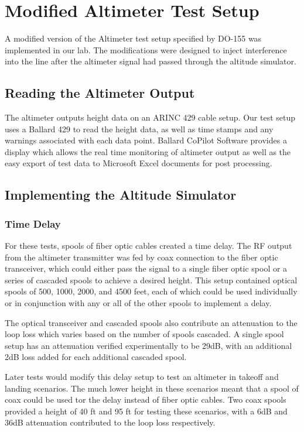 \section{Modified Altimeter Test Setup} 
A modified version of the Altimeter test setup specified by DO-155 was implemented in our lab. The modifications were designed to inject interference into the line after the altimeter signal had passed through the altitude simulator. 
\subsection{Reading the Altimeter Output}
The altimeter outputs height data on an ARINC 429 cable setup. Our test setup uses a Ballard 429 to read the height data, as well as time stamps and any warnings associated with each data point. Ballard CoPilot Software provides a display which allows the real time monitoring of altimeter output as well as the easy export of test data to Microsoft Excel documents for post processing. 
\subsection{Implementing the Altitude Simulator}
\subsubsection{Time Delay}
For these tests, spools of fiber optic cables created a time delay. The RF output from the altimeter transmitter was fed by coax connection to the fiber optic transceiver, which could either pass the signal to a single fiber optic spool or a series of cascaded spools to achieve a desired height. This setup contained optical spools of 500, 1000, 2000, and 4500 feet, each of which could be used individually or in conjunction with any or all of the other spools to implement a delay.

 The optical transceiver and cascaded spools also contribute an attenuation to the loop loss which varies based on the number of spools cascaded. A single spool setup has an attenuation verified experimentally to be 29dB, with an additional 2dB loss added for each additional cascaded spool.

Later tests would modify this delay setup to test an altimeter in takeoff and landing scenarios. The much lower height in these scenarios meant that a spool of coax could be used tor the delay instead of fiber optic cables. Two coax spools provided a height of 40 ft and 95 ft for testing these scenarios, with a 6dB and 36dB attenuation contributed to the loop loss respectively.  

